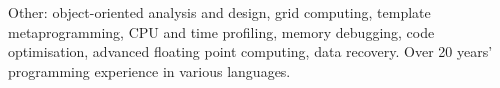 \begin{longtable}{p{}p{}p{}}
\end{longtable}
\vspace{2\longtabletopsepspecial}
\begin{flushleft}
Other: object-oriented analysis and design, grid computing, \Cplusplus template metaprogramming, CPU and time profiling, memory debugging, code optimisation, advanced floating point computing, data recovery. Over 20 years' programming experience in various languages.
\end{flushleft}










